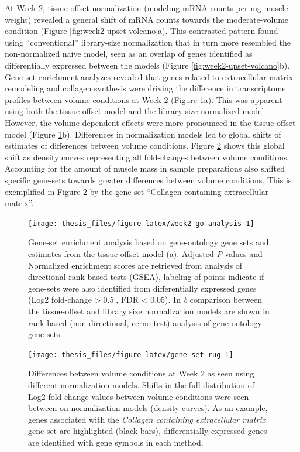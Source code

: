 \documentclass[twoside,10pt]{gihclass} %
\begin{document}
At Week 2, tissue-offset normalization (modeling mRNA counts per-mg-muscle weight) revealed a general shift of mRNA counts towards the moderate-volume condition (Figure \ref{fig:week2-upset-volcano}a).
This contrasted pattern found using ``conventional'' library-size normalization that in turn more resembled the non-normalized naive model, seen as an overlap of genes identified as differentially expressed between the models (Figure \ref{fig:week2-upset-volcano}b).
Gene-set enrichment analyzes revealed that genes related to extracellular matrix remodeling and collagen synthesis were driving the difference in transcriptome profiles between volume-conditions at Week 2
(Figure \ref{fig:week2-go-analysis}a).
This was apparent using both the tissue offset model and the library-size normalized model. However, the volume-dependent effects were more pronounced in the tissue-offset model
(Figure \ref{fig:week2-go-analysis}b).
Differences in normalization models led to global shifts of estimates of differences between volume conditions. Figure \ref{fig:gene-set-rug} shows this global shift as density curves representing all fold-changes between volume conditions. Accounting for the amount of muscle mass in sample preparations also shifted specific gene-sets towards greater differences between volume conditions. This is exemplified in Figure \ref{fig:gene-set-rug} by the gene set ``Collagen containing extracellular matrix''.
\begin{figure}

{\centering \texttt{[image: thesis\_files/figure-latex/week2-go-analysis-1]} 

}

\caption[Gene-set enrichment analysis at Week 2]{Gene-set enrichment analysis based on gene-ontology gene sets and estimates from the tissue-offset model (a). Adjusted \textit{P}-values and Normalized enrichment scores are retrieved from analysis of directional rank-based tests (GSEA), labeling of points indicate if gene-sets were also identified from differentially expressed genes (Log2 fold-change >|0.5|, FDR < 0.05). In \textit{b} comparison between the tissue-offset and library size normalization models are shown in rank-based (non-directional, cerno-test) analysis of gene ontology gene sets.}\label{fig:week2-go-analysis}
\end{figure}
\begin{figure}

{\centering \texttt{[image: thesis\_files/figure-latex/gene-set-rug-1]} 

}

\caption[Global shifts in volume-dependent fold change as an effect of normalization methods at Week 2]{Differences between volume conditions at Week 2 as seen using different normalization models. Shifts in the full distribution of Log2-fold change values between volume conditions were seen between on normalization models (density curves). As an example, genes associated with the \textit{Collagen containing extracellular matrix} gene set are highlighted (black bars), differentially expressed genes are identified with gene symbols in each method.}\label{fig:gene-set-rug}
\end{figure}
\end{document}
